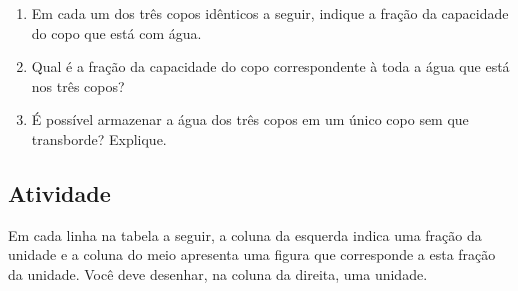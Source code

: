 \documentclass[a4,12pt]{book}
\begin{document}
\begin{enumerate} [\quad a)] %
  \item     Em cada um dos três copos idênticos a seguir, indique a fração da capacidade do copo que está com água.
\begin{center}

\end{center}
  \item     Qual é a fração da capacidade do copo correspondente à toda a água que está nos três copos?
  \item     É possível armazenar a água dos três copos em um único copo sem que transborde? Explique.
\end{enumerate} %


\subsection{Atividade}

Em cada linha na tabela a seguir, a coluna da esquerda indica uma fração da unidade e a coluna do meio apresenta uma figura que corresponde a esta fração da unidade. Você deve desenhar, na coluna da direita, uma unidade. 
\end{document}

